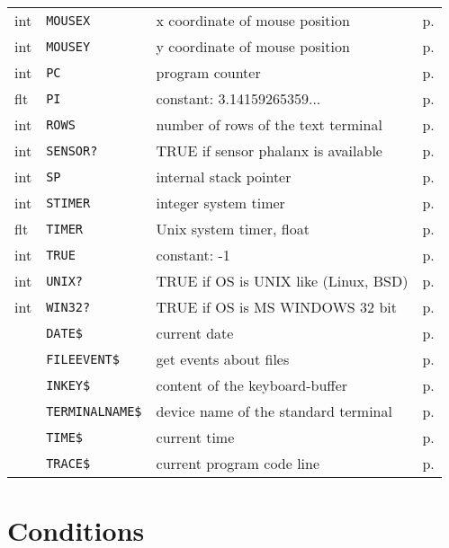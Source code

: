 \begin{center}
\begin{longtable}{llll}
int& {\tt MOUSEX   } 	  & x coordinate of mouse position          & p.\pageref{MOUSEX}\\
int& {\tt MOUSEY   } 	  & y coordinate of mouse position          & p.\pageref{MOUSEY}\\
int& {\tt PC       } 	  & program counter                         & p.\pageref{PC}\\
flt& {\tt PI       } 	  & constant: 3.14159265359...              & p.\pageref{PI}\\
int& {\tt ROWS     } 	  & number of rows of the text terminal     & p.\pageref{ROWS}\\
int& {\tt SENSOR?  } 	  & TRUE if sensor phalanx is available     & p.\pageref{SENSORf}\\
int& {\tt SP       } 	  & internal stack pointer                  & p.\pageref{SP}\\
int& {\tt STIMER   } 	  & integer system timer                    & p.\pageref{STIMER}\\
flt& {\tt TIMER    } 	  & Unix system timer, float                & p.\pageref{TIMER}\\ 
int& {\tt TRUE     } 	  & constant: -1                            & p.\pageref{TRUE}\\
int& {\tt UNIX?    } 	  & TRUE if OS is UNIX like (Linux, BSD)    & p.\pageref{UNIXf}\\
int& {\tt WIN32?   } 	  & TRUE if OS is MS WINDOWS 32 bit         & p.\pageref{WIN32f}\\

&{\tt DATE\$}	      &    current date                             & p.\pageref{DATES}\\
&{\tt FILEEVENT\$ }   &    get events about files                   & p.\pageref{FILEEVENTS}\\
&{\tt INKEY\$  }      &    content of the keyboard-buffer           & p.\pageref{INKEYS}\\
&{\tt TERMINALNAME\$} &device name of the standard terminal         & p.\pageref{TERMINALNAMES}\\
&{\tt TIME\$}	      &    current time                             & p.\pageref{TIMES}\\
&{\tt TRACE\$}        &   current program code line                 & p.\pageref{TRACES}\\
\end{longtable}
\end{center}

\section{Conditions}


